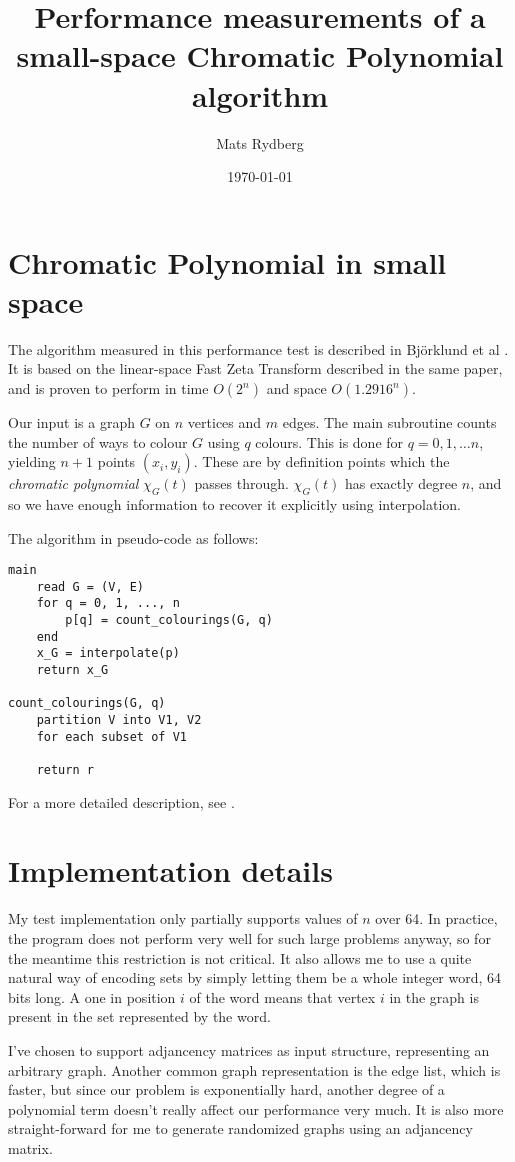 \documentclass[a4paper, titlepage]{article}
\title{\huge{Performance measurements of a small-space Chromatic Polynomial algorithm}}
\author{Mats Rydberg}
\date{\today}
\begin{document}
\maketitle

\section{Chromatic Polynomial in small space}
The algorithm measured in this performance test is described in Björklund et al \cite{cov_pack}. It is based on the linear-space Fast Zeta Transform described in the same paper, and is proven to perform in time $O(2^n)$ and space $O(1.2916^n)$.

Our input is a graph $G$ on $n$ vertices and $m$ edges. The main subroutine counts the number of ways to colour $G$ using $q$ colours. This is done for $q = 0, 1, \ldots n$, yielding $n + 1$ points $(x_i, y_i)$. These are by definition points which the \emph{chromatic polynomial} $\chi_G(t)$ passes through. $\chi_G(t)$ has exactly degree $n$, and so we have enough information to recover it explicitly using interpolation.

The algorithm in pseudo-code as follows:

\begin{verbatim}
main
    read G = (V, E)
    for q = 0, 1, ..., n
        p[q] = count_colourings(G, q)
    end
    x_G = interpolate(p)
    return x_G

count_colourings(G, q)
    partition V into V1, V2
    for each subset of V1
        
    return r
\end{verbatim}

For a more detailed description, see \cite{cov_pack}.

\section{Implementation details}
My test implementation only partially supports values of $n$ over 64. In practice, the program does not perform very well for such large problems anyway, so for the meantime this restriction is not critical. It also allows me to use a quite natural way of encoding sets by simply letting them be a whole integer word, 64 bits long. A one in position $i$ of the word means that vertex $i$ in the graph is present in the set represented by the word.

I've chosen to support adjancency matrices as input structure, representing an arbitrary graph. Another common graph representation is the edge list, which is faster, but since our problem is exponentially hard, another degree of a polynomial term doesn't really affect our performance very much. It is also more straight-forward for me to generate randomized graphs using an adjancency matrix.
\end{document}
